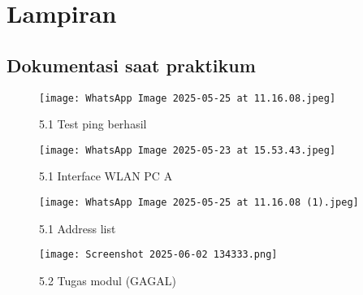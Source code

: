\section{Lampiran}
\subsection{Dokumentasi saat praktikum}
\begin{figure}[htbp]
    \centering
    \texttt{[image: WhatsApp Image 2025-05-25 at 11.16.08.jpeg]}
    \caption{5.1 Test ping berhasil}
    \label{fig:enter-label}
\end{figure}
\begin{figure}
    \centering
    \texttt{[image: WhatsApp Image 2025-05-23 at 15.53.43.jpeg]}
    \caption{5.1 Interface WLAN PC A}
    \label{fig:enter-label}
\end{figure}
\begin{figure}
    \centering
    \texttt{[image: WhatsApp Image 2025-05-25 at 11.16.08 (1).jpeg]}
    \caption{5.1 Address list}
    \label{fig:enter-label}
\end{figure}
\begin{figure}
    \centering
    \texttt{[image: Screenshot 2025-06-02 134333.png]}
    \caption{5.2 Tugas modul (GAGAL)}
    \label{fig:enter-label}
\end{figure}
